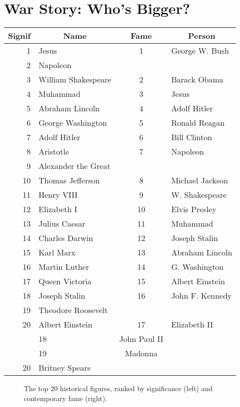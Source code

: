 \documentclass[10pt]{article}
\begin{document}
\section{War Story: Who’s Bigger?}

\begin{center}
\begin{tabular}{|r|l|c|l|}
\hline
Signif & \multicolumn{1}{|c|}{Name} & \multicolumn{1}{|c|}{Fame} & \multicolumn{1}{|c|}{Person} \\
\hline
1 & Jesus & 1 & George W. Bush \\
2 & Napoleon &  &  \\
3 & William Shakespeare & 2 & Barack Obama \\
4 & Muhammad & 3 & Jesus \\
5 & Abraham Lincoln & 4 & Adolf Hitler \\
6 & George Washington & 5 & Ronald Reagan \\
7 & Adolf Hitler & 6 & Bill Clinton \\
8 & Aristotle & 7 & Napoleon \\
9 & Alexander the Great &  &  \\
10 & Thomas Jefferson & 8 & Michael Jackson \\
11 & Henry VIII & 9 & W. Shakespeare \\
12 & Elizabeth I & 10 & Elvis Presley \\
13 & Julius Caesar & 11 & Muhammad \\
14 & Charles Darwin & 12 & Joseph Stalin \\
15 & Karl Marx & 13 & Abraham Lincoln \\
16 & Martin Luther & 14 & G. Washington \\
17 & Queen Victoria & 15 & Albert Einstein \\
18 & Joseph Stalin & 16 & John F. Kennedy \\
19 & Theodore Roosevelt &  &  \\
20 & Albert Einstein & 17 & Elizabeth II \\
 & 18 & John Paul II &  \\
 & 19 & Madonna &  \\
20 & Britney Spears &  &  \\
\hline
\end{tabular}
\end{center}

\begin{figure}
\centering
\caption{The top 20 historical figures, ranked by significance (left) and contemporary fame (right).}
\end{figure}
\end{document}
